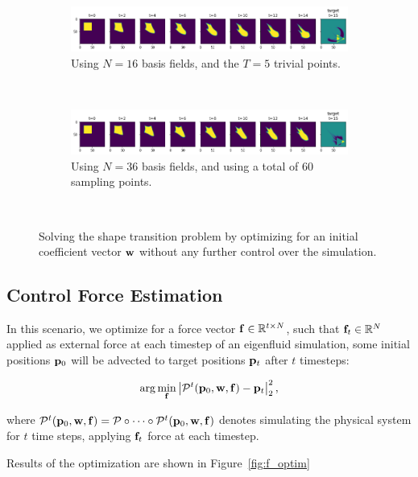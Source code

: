 \begin{figure}
\begin{subfigure}{\textwidth}
    \centering
    \includegraphics[width=\textwidth]{figures/points-velocity-only/T5/trajectory_horizontal.png}
    \caption{Using $N=16$ basis fields, and the $T=5$ trivial points.}
    \label{fig:points-vel-only-small}
  \end{subfigure}\\
  \begin{subfigure}{\textwidth}
    \centering
    \includegraphics[width=\textwidth]{figures/points-velocity-only/O30_U30_T0/trajectory_horizontal.png}
    \caption{Using $N=36$ basis fields, and using a total of $60$ sampling
    points.}
    \label{fig:points-vel-only-big}
  \end{subfigure}\\
  \caption{Solving the shape transition problem by optimizing for an initial
  coefficient vector $\vb{w}$ without any further control over the simulation.}
  \label{fig:points-vel-only}
\end{figure}

\subsection{Control Force Estimation}\label{section:cfe}
In this scenario, we optimize for a force vector $\vb{f} \in \mathbb{R}^{t\times
N}$, such that $\vb{f}_t \in \mathbb{R}^N$ applied as external force at each
timestep of an eigenfluid simulation, some initial positions $\vb{p}_0$ will be
advected to target positions $\vb{p}_t$ after $t$ timesteps:

$$\arg\min_{\vb{f}} \left| \mathcal{P}^{t}(\vb{p}_0, \vb{w}, \vb{f})
  - \vb{p}_t\right|_2^2,$$

where $\mathcal{P}^{t}(\vb{p}_0, \vb{w}, \vb{f}) = \mathcal{P} \circ \dots
\circ \mathcal{P}^{t}(\vb{p}_0, \vb{w}, \vb{f})$ denotes simulating the
physical system for $t$ time steps, applying $\vb{f}_t$ force at each
timestep.

Results of the optimization are shown in Figure~\ref{fig:f_optim}

